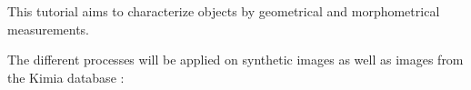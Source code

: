 \def\difficulty{1}

\begin{note}This tutorial aims to characterize objects by geometrical and morphometrical measurements.
\end{note}


\noindent The different processes will be applied on synthetic images as well as images from the Kimia database \cite{KimiaDB,Sharvit1998}:
{
\makeatletter
\renewcommand\fs@ruled{\def\@fs@cfont{\bfseries}\let\@fs@capt\floatc@ruled
	\def\@fs@pre{\hrule height.8pt depth0pt \kern2pt}%
	\def\@fs@post{\kern2pt\hrule\relax}%
	\def\@fs@mid{\vskip2pt}%
	\let\@fs@iftopcapt\iftrue}
\makeatother
\begin{figure}[H]
\centering
{}\hfill
{}\hfill
{}
\vspace*{-9pt}
\end{figure}
}

